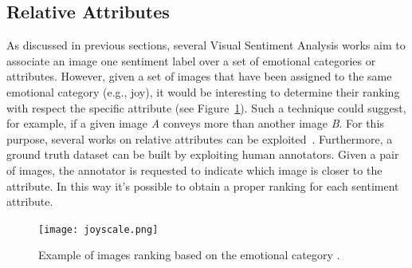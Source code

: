 \subsection{Relative Attributes}
As discussed in previous sections, several Visual Sentiment Analysis works aim to associate an image one sentiment label over a set of emotional categories or attributes. However, given a set of images that have been assigned to the same emotional category (e.g., joy), it would be interesting to determine their ranking with respect the specific attribute (see Figure~\ref{figJoyscale}). Such a technique could suggest, for example, if a given image \textit{A} conveys more  than another image \textit{B}. For this purpose, several works on relative attributes can be exploited~\cite{parikh2011relative, altwaijry2013relative, fan2013relative, yu2015just}.
Furthermore, a ground truth dataset can be built by exploiting human annotators. Given a pair of images, the annotator is requested to indicate which image is closer to the attribute. In this way it's possible to obtain a proper ranking for each sentiment attribute.
\begin{figure}
	\centering
	\texttt{[image: joyscale.png]}
	\caption{Example of images ranking based on the emotional category .}
	\label{figJoyscale}
\end{figure}


